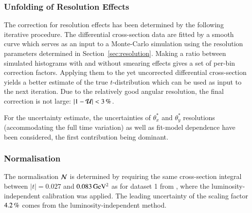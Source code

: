 


\subsubsection{Unfolding of Resolution Effects}
\label{sec:unfolding}

The correction for resolution effects has been determined by the following iterative procedure. The differential cross-section data are fitted by a smooth curve which serves as an input to a Monte-Carlo simulation using the resolution parameters determined in Section~\ref{sec:resolution}. Making a ratio between simulated histograms with and without smearing effects gives a set of per-bin correction factors. Applying them to the yet uncorrected differential cross-section yields a better estimate of the true $t$-distribution which can be used as input to the next iteration. Due to the relatively good angular resolution, the final correction is not large: $|1 - {\cal U}| < 3\,{\rm \%}$.

For the uncertainty estimate, the uncertainties of $\theta_x^*$ and $\theta_y^*$ resolutions (accommodating the full time variation) as well as fit-model dependence have been considered, the first contribution being dominant.




\subsubsection{Normalisation}
\label{sec:normalisation}

The normalisation ${\cal N}$ is determined by requiring the same cross-section integral between $|t| = 0.027$ and $0.083\,{\rm GeV^2}$ as for dataset 1 from \cite{prl111}, where the luminosity-independent calibration was applied. The leading uncertainty of the scaling factor $4.2\,{\rm \%}$ comes from the luminosity-independent %
method.





